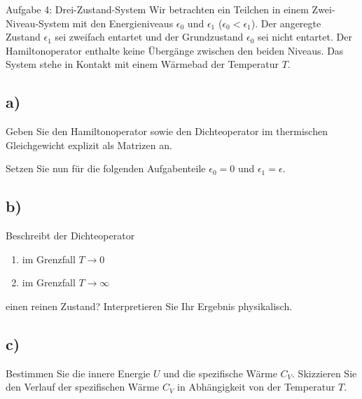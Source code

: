 \begin{aufgabe}{Aufgabe 4: Drei-Zustand-System}
    Wir betrachten ein Teilchen in einem Zwei-Niveau-System mit den Energieniveaus $\epsilon_0$ und $\epsilon_1$ ($\epsilon_0 < \epsilon_1$).
    Der angeregte Zustand $\epsilon_1$ sei zweifach entartet und der Grundzustand $\epsilon_0$ sei nicht entartet.
    Der Hamiltonoperator enthalte keine Übergänge zwischen den beiden Niveaus.
    Das System stehe in Kontakt mit einem Wärmebad der Temperatur $T$.

    \subsection{a)}
    Geben Sie den Hamiltonoperator sowie den Dichteoperator im thermischen Gleichgewicht explizit als Matrizen an.


    Setzen Sie nun für die folgenden Aufgabenteile $\epsilon_0 = 0$ und $\epsilon_1 = \epsilon$.

    \subsection{b)}
    Beschreibt der Dichteoperator
    \begin{enumerate}[label=(\roman*)]
        \item im Grenzfall $T \to 0$
        \item im Grenzfall $T \to \infty$
    \end{enumerate}
    einen reinen Zustand?
    Interpretieren Sie Ihr Ergebnis physikalisch.

    \subsection{c)}
    Bestimmen Sie die innere Energie $U$ und die spezifische Wärme $C_V$.
    Skizzieren Sie den Verlauf der spezifischen Wärme $C_V$ in Abhängigkeit von der Temperatur $T$.
\end{aufgabe}



